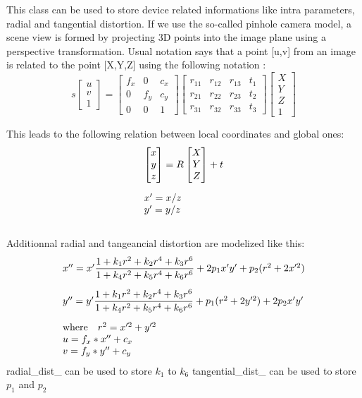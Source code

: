 This class can be used to store device related informations like intra parameters, radial and tangential distortion. If we use the so-\/called pinhole camera model, a scene view is formed by projecting 3D points into the image plane using a perspective transformation. Usual notation says that a point \mbox{[}u,v\mbox{]} from an image is related to the point \mbox{[}X,Y,Z\mbox{]} using the following notation : \[ s \begin{bmatrix} u \\ v \\ 1 \end{bmatrix} = \begin{bmatrix}f_x & 0 & c_x \\ 0 & f_y & c_y \\ 0 & 0 & 1 \end{bmatrix} \begin{bmatrix} r_{11} & r_{12} & r_{13} & t_1 \\ r_{21} & r_{22} & r_{23} & t_2 \\ r_{31} & r_{32} & r_{33} & t_3 \end{bmatrix} \begin{bmatrix} X \\ Y \\ Z \\ 1 \end{bmatrix} \]

This leads to the following relation between local coordinates and global ones: \[ \begin{array}{l} \vspace{10pt} \begin{bmatrix} x \\ y \\ z \end{bmatrix} = R \begin{bmatrix} X \\ Y \\ Z \end{bmatrix} + t \\ x' = x/z \\ y' = y/z \vspace{10pt} \end{array} \]

Additionnal radial and tangeancial distortion are modelized like this: \[ \begin{array}{l} \vspace{10pt} x'' = x' \dfrac{1 + k_1 r^2 + k_2 r^4 + k_3 r^6}{1 + k_4 r^2 + k_5 r^4 + k_6 r^6} + 2 p_1 x' y' + p_2(r^2 + 2 x'^2) \\ \vspace{10pt} y'' = y' \dfrac{1 + k_1 r^2 + k_2 r^4 + k_3 r^6}{1 + k_4 r^2 + k_5 r^4 + k_6 r^6} + p_1 (r^2 + 2 y'^2) + 2 p_2 x' y' \\ \text{where} \quad r^2 = x'^2 + y'^2 \\ u = f_x*x'' + c_x \\ v = f_y*y'' + c_y \end{array} \] radial\_\-dist\_\- can be used to store $k_1$ to $k_6$ tangential\_\-dist\_\- can be used to store $p_1$ and $p_2$

